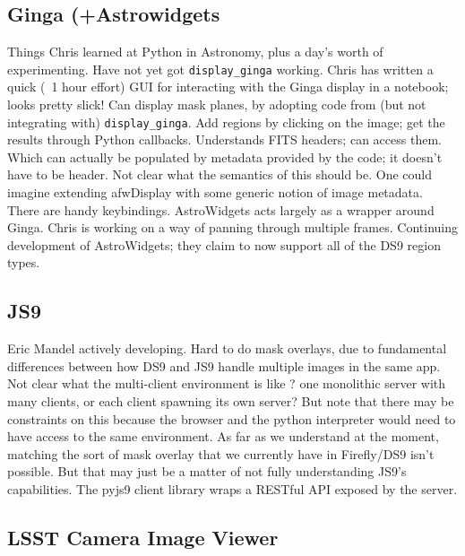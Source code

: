 \subsection{Ginga (+Astrowidgets}
Things Chris learned at Python in Astronomy, plus a day's worth of experimenting.
Have not yet got \texttt{display\_ginga} working.
Chris has written a quick (~1 hour effort) GUI for interacting with the Ginga display in a notebook; looks pretty slick!
Can display mask planes, by adopting code from (but not integrating with) \texttt{display\_ginga}.
Add regions by clicking on the image; get the results through Python callbacks.
Understands FITS headers; can access them.
Which can actually be populated by metadata provided by the code; it doesn't have to be header.
Not clear what the semantics of this should be.
One could imagine extending afwDisplay with some generic notion of image metadata.
There are handy keybindings.
AstroWidgets acts largely as a wrapper around Ginga.
Chris is working on a way of panning through multiple frames.
Continuing development of AstroWidgets; they claim to now support all of the DS9 region types.

\subsection{JS9}

Eric Mandel actively developing.
Hard to do mask overlays, due to fundamental differences between how DS9 and JS9 handle multiple images in the same app.
Not clear what the multi-client environment is like ? one monolithic server with many clients, or each client spawning its own server?
But note that there may be constraints on this because the browser and the python interpreter would need to have access to the same environment.
As far as we understand at the moment, matching the sort of mask overlay that we currently have in Firefly/DS9 isn't possible.
But that may just be a matter of not fully understanding JS9's capabilities.
The pyjs9 client library wraps a RESTful API exposed by the server.


\subsection{LSST Camera Image Viewer}

